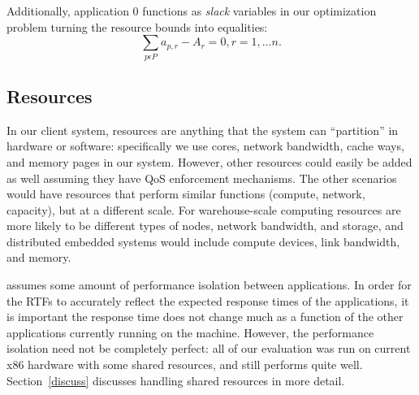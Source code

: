 Additionally, application 0 functions as \emph{slack} variables in our optimization problem turning the resource bounds into equalities:
\begin{equation}
\sum_{p\epsilon P} a_{p,r} - A_r = 0, r = 1,\dots n.
\end{equation}

\subsection*{Resources}
In our client system, resources are anything that the system can ``partition'' in hardware or software: specifically we use cores, network bandwidth, cache ways, and memory pages in our system.  However, other resources could easily be added as well assuming they have QoS enforcement mechanisms.  The other scenarios would have resources that perform similar functions (compute, network, capacity), but at a different scale. For warehouse-scale computing resources are more likely to be different types of nodes, network bandwidth, and storage, and distributed embedded systems would include compute devices, link bandwidth, and memory.

\pacora assumes some amount of performance isolation between applications.  In order for the RTFs to accurately reflect the expected response times of the applications, it is important the response time does not change much as a function of the other applications currently running on the machine.   However, the performance isolation need not be completely perfect: all of our evaluation was run on current x86 hardware with some shared resources, and \pacora still performs quite well. Section~\ref{discuss} discusses handling shared resources in more detail.


